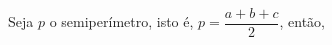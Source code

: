 \documentclass[preview]{standalone}
\begin{document}
\begin{center}
Seja $p$ o semiperímetro, isto é, $p = \dfrac{a+b+c}{2}$, então,
\end{center}
\end{document}
